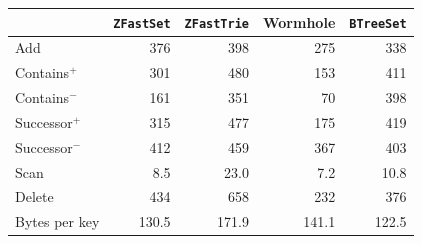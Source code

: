 \begin{tabular}{lrrrr}
&\multicolumn{1}{c}{\texttt{ZFastSet}}&\multicolumn{1}{c}{\texttt{ZFastTrie}}&\multicolumn{1}{c}{Wormhole}&\multicolumn{1}{c}{\texttt{BTreeSet}}\\
\hline
Add & 376 & 398 & 275 & 338\\
Contains$^+$ & 301 & 480 & 153 & 411\\
Contains$^-$ & 161 & 351 & 70 & 398\\
Successor$^+$ & 315 & 477 & 175 & 419\\
Successor$^-$ & 412 & 459 & 367 & 403\\
Scan & 8.5 & 23.0 & 7.2 & 10.8\\
Delete & 434 & 658 & 232 & 376\\
\hline
Bytes per key & 130.5 & 171.9 & 141.1 & 122.5\\
\end{tabular}
